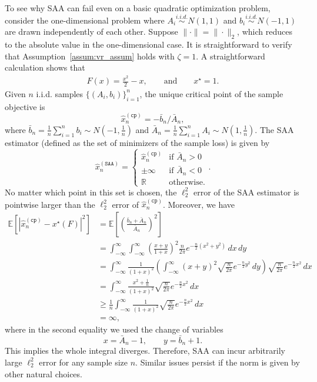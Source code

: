 \documentclass[11pt,twoside]{article}
\numberwithin{equation}{section}
\newcommand{\EE}{\mathbb{E}}
\newcommand{\1}{\mathbf{1}}
\theoremstyle{remark}
\theoremstyle{plain}
\newcommand{\xSAA}{\widehat x^{(\texttt{SAA})}}
\newcommand{\cp}{\widehat x_n^{(\texttt{cp})}}
\begin{document}
To see why SAA can fail even on a basic quadratic optimization problem,
consider the  one-dimensional  problem where $A_i \overset{i.i.d.}{\sim} N(1,1)$ and $b_i \overset{i.i.d.}{\sim} N(-1, 1)$ are drawn independently of each other. Suppose $\| \cdot \| = \| \cdot \|_2$, which reduces to the absolute value in the one-dimensional case. It is straightforward to verify that Assumption~\ref{assum:vr_assum} holds with $\zeta = 1$. A straightforward calculation shows that
\begin{align*}
F(x) = \frac{x^2}{2} - x, \qquad \text{and} \qquad x^\star = 1.
\end{align*}
Given $n$ i.i.d. samples $\{(A_i, b_i)\}_{i=1}^{n}$, the unique critical point of the sample objective is 
$$
\cp = -  \bar b_n/\bar A_n,
$$
where $\bar b_n =  \frac{1}{n} \sum_{i=1}^{n} b_i \sim N(-1, \frac{1}{n}) $ and $\bar A_n = \frac{1}{n} \sum_{i=1}^{n} A_i \sim N(1, \frac{1}{n})$. The SAA estimator (defined as the set of minimizers of the sample loss) is given by 
$$\xSAA_n =\begin{cases}
\cp &  \text{if $\bar A_n > 0$} \\
\pm \infty &  \text{if $\bar A_n <  0$} \\
\mathbb{R} &\text{otherwise}.
\end{cases}.$$ 
No matter which point in this set is chosen, the $\ell_2^2$ error of the SAA estimator is pointwise larger than the $\ell_2^2$ error of $\cp$. Moreover, we have
\begin{align*}
\EE[|\cp - x^\star(F)|^2]
&= \EE\left[\left(\frac{\bar b_n + \bar A_n}{\bar A_n}\right)^2\right] \\
&= \int_{-\infty}^{\infty}\int_{-\infty}^{\infty}
\left(\frac{x+y}{1+x}\right)^2
\frac{n}{2\pi}
e^{-\frac{n}{2}(x^2+y^2)}
\, dx\, dy \\
&= \int_{-\infty}^{\infty}
\frac{1}{(1+x)^2}
\left(
\int_{-\infty}^{\infty} (x+y)^2 \sqrt{\frac{n}{2\pi}} e^{-\frac{n}{2}y^2}\,dy
\right)
\sqrt{\frac{n}{2\pi}} e^{-\frac{n}{2}x^2}\,dx \\
&= \int_{-\infty}^{\infty}
\frac{x^2+\frac{1}{n}}{(1+x)^2}
\sqrt{\frac{n}{2\pi}} e^{-\frac{n}{2}x^2}\,dx \\
&\ge
\frac{1}{n}
\int_{-\infty}^{\infty}
\frac{1}{(1+x)^2}
\sqrt{\frac{n}{2\pi}} e^{-\frac{n}{2}x^2}\,dx \\
&= \infty,
\end{align*}
where in the second equality we used the change of variables
\[
x=\bar A_n-1,
\qquad
y=\bar b_n+1.
\]
This implies the whole integral diverges.
Therefore, SAA can incur arbitrarily large $\ell^2_2$ error for any sample size $n$. 
Similar issues persist if the norm is given by other natural choices.
\end{document}
